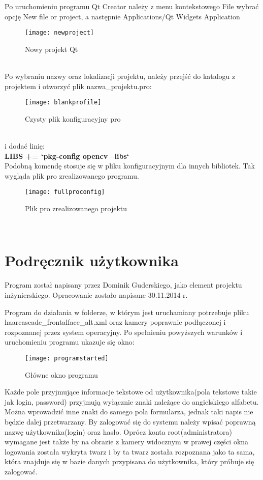 \documentclass[eng,printmode]{mgr}
\begin{document}
Po uruchomieniu programu Qt Creator należy z menu kontekstowego File wybrać opcję New file or project, a następnie Applications/Qt Widgets Application\\
\begin{figure}[placement h]
\texttt{[image: newproject]}
\caption{Nowy projekt Qt}
\end{figure}
\\
Po wybraniu nazwy oraz lokalizacji projektu, należy przejść do katalogu z projektem i otworzyć plik nazwa\_projektu.pro:\\
\begin{figure}[placement h]
\texttt{[image: blankprofile]}
\caption{Czysty plik konfiguracyjny pro}
\end{figure}\\
i dodać linię:\\
\textbf{LIBS += `pkg-config opencv --libs`}\\
Podobną komendę stosuje się w pliku konfiguracyjnym dla innych bibliotek. Tak wygląda plik pro zrealizowanego programu.\\
\begin{figure}[placement h]
\texttt{[image: fullproconfig]}
\caption{Plik pro zrealizowanego projektu}
\end{figure}\\


\section{Podręcznik użytkownika}
Program został napisany przez Dominik Guderskiego, jako element projektu inżynierskiego. Opracowanie zostało napisane 30.11.2014 r.

Program do działania w folderze, w którym jest uruchamiany potrzebuje pliku haarcascade\_frontalface\_alt.xml oraz kamery poprawnie podłączonej i rozpoznanej przez system operacyjny. Po spełnieniu powyższych warunków i uruchomieniu programu ukazuje się okno:\\

\begin{figure}[placement h]
\texttt{[image: programstarted]}
\caption{Główne okno programu}
\end{figure}

Każde pole przyjmujące informacje tekstowe od użytkownika(pola tekstowe takie jak login, password) przyjmują wyłącznie znaki należące do angielskiego alfabetu. Można wprowadzić inne znaki do samego pola formularza, jednak taki napis nie będzie dalej przetwarzany. By zalogować się do systemu należy wpisać poprawną nazwę użytkownika(login) oraz hasło.  Oprócz konta root(administratora) wymagane jest także by na obrazie z kamery widocznym w prawej części okna logowania została wykryta twarz i by ta twarz została rozpoznana jako ta sama, która znajduje się w bazie danych przypisana do użytkownika, który próbuje się zalogować.
\end{document}
